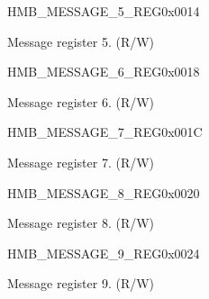 \begin{register}{H}{MB\_MESSAGE\_5\_REG}{0x0014}\label{regdesc:MBMESSAGE5REG}
%
\regnewline%
\begin{regdesc}\begin{reglist}
\label{fielddesc:MBMESSAGE5}\item [MB\_MESSAGE\_5] Message register 5. (R/W)
\end{reglist}\end{regdesc}
\end{register}


\begin{register}{H}{MB\_MESSAGE\_6\_REG}{0x0018}\label{regdesc:MBMESSAGE6REG}
%
\regnewline%
\begin{regdesc}\begin{reglist}
\label{fielddesc:MBMESSAGE6}\item [MB\_MESSAGE\_6] Message register 6. (R/W)
\end{reglist}\end{regdesc}
\end{register}


\begin{register}{H}{MB\_MESSAGE\_7\_REG}{0x001C}\label{regdesc:MBMESSAGE7REG}
%
\regnewline%
\begin{regdesc}\begin{reglist}
\label{fielddesc:MBMESSAGE7}\item [MB\_MESSAGE\_7] Message register 7. (R/W)
\end{reglist}\end{regdesc}
\end{register}


\begin{register}{H}{MB\_MESSAGE\_8\_REG}{0x0020}\label{regdesc:MBMESSAGE8REG}
%
\regnewline%
\begin{regdesc}\begin{reglist}
\label{fielddesc:MBMESSAGE8}\item [MB\_MESSAGE\_8] Message register 8. (R/W)
\end{reglist}\end{regdesc}
\end{register}


\begin{register}{H}{MB\_MESSAGE\_9\_REG}{0x0024}\label{regdesc:MBMESSAGE9REG}
%
\regnewline%
\begin{regdesc}\begin{reglist}
\label{fielddesc:MBMESSAGE9}\item [MB\_MESSAGE\_9] Message register 9. (R/W)
\end{reglist}\end{regdesc}
\end{register}



